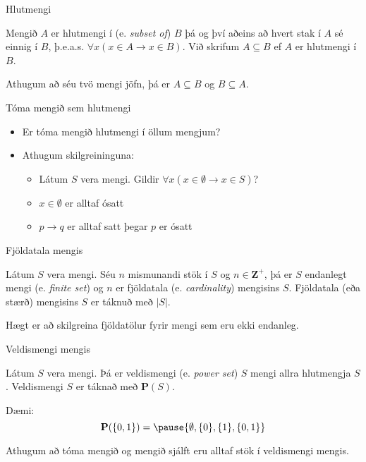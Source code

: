 \documentclass{beamer}
\begin{document}
\begin{frame}{Hlutmengi}
\begin{tcolorbox}[title=Hlutmengi]
Mengið $A$ er hlutmengi í (e. \emph{subset of}) $B$ þá og því aðeins að hvert stak í $A$ sé einnig í $B$, þ.e.a.s. $\forall x (x \in A \to x \in B)$. Við skrifum $A \subseteq B$ ef $A$ er hlutmengi í $B$.
\end{tcolorbox}

Athugum að séu tvö mengi jöfn, þá er $A \subseteq B$ og $B \subseteq A$.
\end{frame}

\begin{frame}{Tóma mengið sem hlutmengi}
\begin{itemize}
 \item Er tóma mengið hlutmengi í öllum mengjum? \pause
 \item Athugum skilgreininguna:
 \begin{itemize}
  \item Látum $S$ vera mengi. Gildir $\forall x (x \in \emptyset \to x \in S)$? \pause
  \item $x \in \emptyset$ er alltaf ósatt \pause
  \item $p \to q$ er alltaf satt þegar $p$ er ósatt
 \end{itemize}
\end{itemize}
\end{frame}

\begin{frame}{Fjöldatala mengis}
\begin{tcolorbox}[title=Fjöldatala]
Látum $S$ vera mengi. Séu $n$ mismunandi stök í $S$ og $n \in \mathbf{Z^+}$, þá er $S$ endanlegt mengi (e. \emph{finite set}) og $n$ er fjöldatala (e. \emph{cardinality}) mengisins $S$. Fjöldatala (eða stærð) mengisins $S$ er táknuð með $|S|$.
\end{tcolorbox}
Hægt er að skilgreina fjöldatölur fyrir mengi sem eru ekki endanleg.
\end{frame}

\begin{frame}{Veldismengi mengis}
\begin{tcolorbox}[title=Veldismengi]
Látum $S$ vera mengi. Þá er veldismengi (e. \emph{power set}) $S$ mengi allra hlutmengja $S$. Veldismengi $S$ er táknað með $\mathbf{P}(S)$.
\end{tcolorbox}
Dæmi: \[\mathbf{P}(\{0, 1\}) = \pause \{\emptyset, \{0\}, \{1\}, \{0, 1\}\}\]

Athugum að tóma mengið og mengið sjálft eru alltaf stök í veldismengi mengis.
\end{frame}
\end{document}
